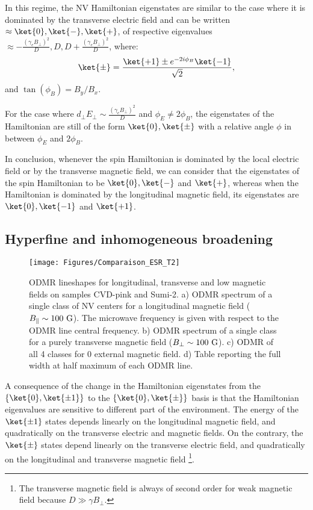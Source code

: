 \documentclass[a4paper,11pt]{report}
\begin{document}
In this regime, the NV Hamiltonian eigenstates are similar to the case where it is dominated by the transverse electric field and can be written $\approx \ket{0}, \ket{-}, \ket{+}$\citep{qiu2021nuclear, qiu2022nanoscale}, of respective eigenvalues $\approx -\frac{(\gamma_e B_\perp)^2}{D},D,D+\frac{(\gamma_e B_\perp)^2}{D}$,  where:
\begin{equation}
\ket{\pm}=\frac{\ket{+1}\pm e^{-2i\phi_B}\ket{-1}}{\sqrt{2}},
\end{equation}
and $\tan(\phi_B)=B_y/B_x$.

For the case where $d_\perp E_\perp \sim \frac{(\gamma_e B_\perp)^2}{D}$ and $\phi_E \neq 2\phi_B$, the eigenstates of the Hamiltonian are still of the form $\ket{0},\ket{\pm}$ with a relative angle $\phi$ in between $\phi_E$ and $2\phi_B$.

In conclusion, whenever the spin Hamiltonian is dominated by the local electric field or by the transverse magnetic field, we can consider that the eigenstates of the spin Hamiltonian to be $\ket{0}, \ket{-}$ and $\ket{+}$, whereas when the Hamiltonian is dominated by the longitudinal magnetic field, its eigenstates are $\ket{0}, \ket{-1}$ and $\ket{+1}$.

\subsection{Hyperfine and inhomogeneous broadening}
\label{sec modif T2*}
\begin{figure}[h]
\centering
\texttt{[image: Figures/Comparaison\_ESR\_T2]}
\caption{ODMR lineshapes for longitudinal, transverse and low magnetic fields on samples CVD-pink and Sumi-2. a) ODMR spectrum of a single class of NV centers for a longitudinal magnetic field ($B_\parallel \sim 100\ \rm G$). The microwave frequency is given with respect to the ODMR line central frequency. b) ODMR spectrum of a single class for a purely transverse magnetic field ($B_\perp \sim 100\ \rm G$). c) ODMR of all 4 classes for 0 external magnetic field. d) Table reporting the full width at half maximum of each ODMR line.}
\label{ESR for T2*}
\end{figure}

A consequence of the change in the Hamiltonian eigenstates from the $\{ \ket{0}, \ket{\pm 1} \}$ to the $\{ \ket{0}, \ket{\pm} \}$ basis is that the Hamiltonian eigenvalues are sensitive to different part of the environment. The energy of the $\ket{\pm 1}$ states depends linearly on the longitudinal magnetic field, and quadratically on the transverse electric and magnetic fields. On the contrary, the $\ket{\pm}$ states depend linearly on the transverse electric field, and quadratically on the longitudinal and transverse magnetic field \footnote{The transverse magnetic field is always of second order for weak magnetic field because $D\gg \gamma B_\perp$.}. 
\end{document}
